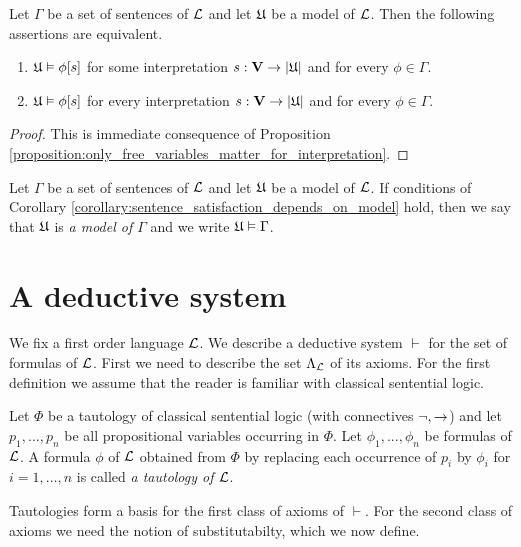 \begin{corollary}\label{corollary:sentence_satisfaction_depends_on_model}
Let $\Gamma$ be a set of sentences of ${\mathcal L}$ and let ${\mathfrak U}$ be a model of ${\mathcal L}$. Then the following assertions are
equivalent.
\begin{enumerate}[label=\emph{\textbf{(\roman*)}}, leftmargin=3.0em]
\item ${\mathfrak U} \vDash \phi[s]$ for some interpretation $s:\mathbf{V}\rightarrow |{\mathfrak U}|$ and for every $\phi \in \Gamma$.
\item ${\mathfrak U} \vDash \phi[s]$ for every interpretation $s:\mathbf{V}\rightarrow |{\mathfrak U}|$ and for every $\phi \in \Gamma$.
\end{enumerate}
\end{corollary}
\begin{proof}
This is immediate consequence of Proposition \ref{proposition:only_free_variables_matter_for_interpretation}.
\end{proof}

\begin{definition}
Let $\Gamma$ be a set of sentences of ${\mathcal L}$ and let ${\mathfrak U}$ be a model of ${\mathcal L}$. If conditions of Corollary \ref{corollary:sentence_satisfaction_depends_on_model} hold, then we say that ${\mathfrak U}$ is \textit{a model of $\Gamma$} and we write ${\mathfrak U} \vDash \Gamma$.
\end{definition}

\section{A deductive system}
\noindent
We fix a first order language ${\mathcal L}$. We describe a deductive system $\vdash$ for the set of formulas of ${\mathcal L}$. First we need to describe the set $\Lambda_{\mathcal L}$ of its axioms. For the first definition we assume that the reader is familiar with classical sentential logic.

\begin{definition}
Let $\Phi$ be a tautology of classical sentential logic (with connectives $\neg, \rightarrow$) and let $p_1,...,p_n$ be all propositional variables occurring in $\Phi$. Let $\phi_1,...,\phi_n$ be formulas of ${\mathcal L}$. A formula $\phi$ of ${\mathcal L}$ obtained from $\Phi$ by replacing each occurrence of $p_i$ by $\phi_i$ for $i = 1, ..., n$ is called \textit{a tautology of ${\mathcal L}$}.
\end{definition}
\noindent
Tautologies form a basis for the first class of axioms of $\vdash$. For the second class of axioms we need the notion of substitutabilty, which we now define.

